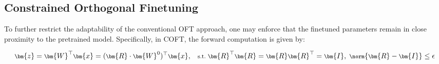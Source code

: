 \subsection{Constrained Orthogonal Finetuning}

To further restrict the adaptability of the conventional OFT approach, one may enforce that the finetuned parameters remain in close proximity to the pretrained model. Specifically, in COFT, the forward computation is given by:

\begin{equation}\label{eq:coft_general}
    \footnotesize
    \bm{z}=\bm{W}^\top\bm{x}=(\bm{R}\cdot\bm{W}^0)^\top\bm{x},~~~\text{s.t.}~\bm{R}^\top\bm{R}=\bm{R}\bm{R}^\top=\bm{I},~\norm{\bm{R}-\bm{I}}\leq \epsilon
\end{equation}

